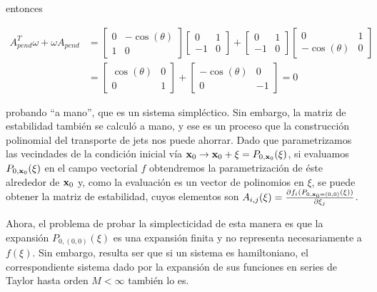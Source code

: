 entonces

\begin{align*}
  A_{pend}^T \omega + \omega A_{pend} &=
  \begin{bmatrix}
    0 & -\cos(\theta) \\
    1 & 0
  \end{bmatrix}   
  \begin{bmatrix}
    0  & 1 \\
    -1 & 0
  \end{bmatrix} 
  +
  \begin{bmatrix}
    0  & 1 \\
    -1 & 0
  \end{bmatrix} 
  \begin{bmatrix}
    0             & 1 \\
    -\cos(\theta) & 0
  \end{bmatrix} \\
  &=
  \begin{bmatrix}
    \cos(\theta)  & 0 \\
    0             & 1
  \end{bmatrix}
  +
  \begin{bmatrix}
    -\cos(\theta)  & 0 \\
    0              & -1
  \end{bmatrix}
  = 0 
\end{align*}

probando ``a mano'', que es un sistema simpléctico. Sin embargo, la matriz de estabilidad también se calculó a mano, y ese es un proceso que la construcción polinomial del transporte de jets nos puede ahorrar. Dado que parametrizamos las vecindades de la condición inicial vía $\mathbf{x}_0 \to \mathbf{x}_0 + \xi = P_{0,\mathbf{x}_0}(\xi)$, si evaluamos $P_{0,\mathbf{x}_0}(\xi)$ en el campo vectorial $f$ obtendremos la parametrización de éste alrededor de $\mathbf{x}_0$ y, como la evaluación es un vector de polinomios en $\xi$, se puede obtener la matriz de estabilidad, cuyos elementos son $A_{i,j}(\xi) = \frac{\partial f_i(P_{0,\mathbf{x}_0=(0,0)}(\xi))}{\partial \xi_j}$.

Ahora, el problema de probar la simplecticidad de esta manera es que la expansión $P_{0,(0,0)}(\xi)$ es una expansión finita y no representa necesariamente a $f(\xi)$. Sin embargo, resulta ser que si un sistema es hamiltoniano, el correspondiente sistema dado por la expansión de sus funciones en series de Taylor hasta orden $M < \infty$ también lo es.

